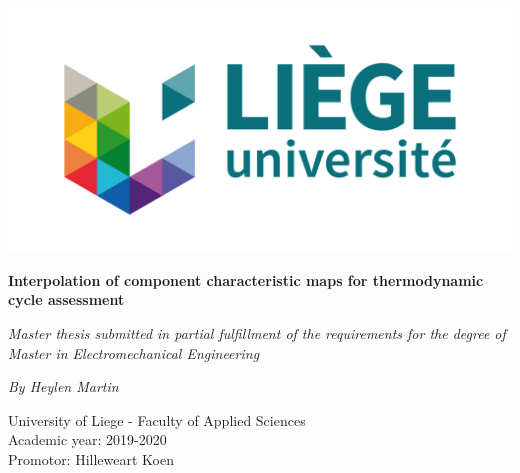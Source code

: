 \documentclass[12pt,a4paper]{report}
\begin{document}
\begin{titlepage}

\centering
\includegraphics{logo_ulg.jpg}%

\vspace*{1cm}
\hrulefill
\begin{center}\bfseries\Huge
Interpolation of component characteristic maps for thermodynamic cycle assessment
\end{center}
\hrulefill
\vspace*{0.2cm}
\begin{center}\Large
\textit{Master thesis submitted in partial fulfillment of the requirements
for the degree of Master in Electromechanical Engineering}
\end{center}
\begin{center}\Large
\textit{By Heylen Martin}
\end{center}
\vspace*{0.2cm}

\begin{center}\bfseries\large

University of Liege - Faculty of Applied Sciences \\
Academic year: 2019-2020\\
Promotor: Hilleweart Koen
\end{center}
\begin{flushright}

\end{flushright} 

\end{titlepage}



\pagestyle{empty}
\tableofcontents
\listoffigures
\listoftables
\newpage
\end{document}
